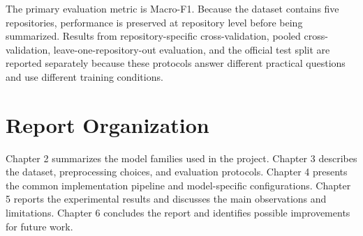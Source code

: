 The primary evaluation metric is Macro-F1. Because the dataset contains five repositories, performance is preserved at repository level before being summarized. Results from repository-specific cross-validation, pooled cross-validation, leave-one-repository-out evaluation, and the official test split are reported separately because these protocols answer different practical questions and use different training conditions.

\section{Report Organization}
Chapter 2 summarizes the model families used in the project. Chapter 3 describes the dataset, preprocessing choices, and evaluation protocols. Chapter 4 presents the common implementation pipeline and model-specific configurations. Chapter 5 reports the experimental results and discusses the main observations and limitations. Chapter 6 concludes the report and identifies possible improvements for future work.
